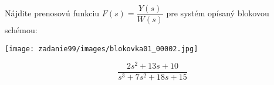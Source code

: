 \documentclass{article}
\begin{document}
\begin{task}

    Nájdite prenosovú funkciu $F(s)=\dfrac{Y(s)}{W(s)}$ pre systém opísaný blokovou schémou: 

    \texttt{[image: zadanie99/images/blokovka01\_00002.jpg]} 

\end{task}
\begin{equation*}

        \dfrac{2s^2+13s+10}{s^3+7s^2+18s+15}
    
\end{equation*}
\end{document}
